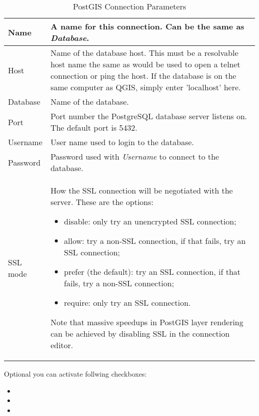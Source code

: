 \begin{table}[ht]
\centering
\caption{PostGIS Connection
Parameters}\label{tab:postgis_connection_parms}\medskip
 \begin{tabular}{|l|p{5in}|}
\hline Name & A name for this connection. Can be the same as \textsl{Database}.
\\
\hline Host \index{PostgreSQL!host}
& Name of the database host. This must be a resolvable host name the same as
would be used to open a telnet connection or ping the host. If the database is 
on the same computer as QGIS, simply enter 'localhost' here. \\
\hline Database \index{PostgreSQL!database} & Name of the database.  \\
\hline Port \index{PostgreSQL!port}& Port number the PostgreSQL database
server listens on. The default port is 5432.\\
\hline Username \index{PostgreSQL!username}& User name used to login to the
database. \\
\hline Password \index{PostgreSQL!password}& Password used with
\textsl{Username} to connect to the database.\\
\hline SSL mode \index{PostgreSQL!sslmode}& How the SSL connection will be negotiated with the server. These are the options: 
\begin {itemize}
\item disable: only try an unencrypted SSL connection;
\item allow: try a non-SSL connection, if that fails, try an SSL connection;
\item prefer (the default): try an SSL connection, if that fails, try a non-SSL connection;
\item require: only try an SSL connection.
\end {itemize}
Note that massive speedups in PostGIS layer rendering can be achieved by disabling SSL in the connection editor. \\
\hline
\end{tabular}
\end{table}

Optional you can activate follwing checkboxes:

\begin{itemize}
\item {}
\item {}
\item {}
\end{itemize}

